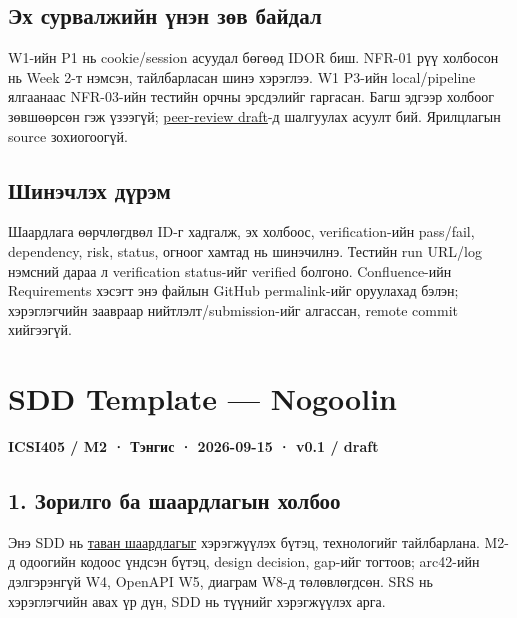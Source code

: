 \documentclass[
  11pt,
  a4paper,
]{article}
\begin{document}
\begin{landscape}
\subsection{Эх сурвалжийн үнэн зөв
байдал}\label{doc5-ux44dux445-ux441ux443ux440ux432ux430ux43bux436ux438ux439ux43d-ux4afux43dux44dux43d-ux437ux4e9ux432-ux431ux430ux439ux434ux430ux43b}

W1-ийн P1 нь cookie/session асуудал бөгөөд IDOR биш. NFR-01 рүү холбосон
нь Week 2-т нэмсэн, тайлбарласан шинэ хэрэглээ. W1 P3-ийн local/pipeline
ялгаанаас NFR-03-ийн тестийн орчны эрсдэлийг гаргасан. Багш эдгээр
холбоог зөвшөөрсөн гэж үзээгүй;
\href{wiki/peer-review-draft.md}{peer-review draft}-д шалгуулах асуулт
бий. Ярилцлагын source зохиогоогүй.

\subsection{Шинэчлэх
дүрэм}\label{doc5-ux448ux438ux43dux44dux447ux43bux44dux445-ux434ux4afux440ux44dux43c}

Шаардлага өөрчлөгдвөл ID-г хадгалж, эх холбоос, verification-ийн
pass/fail, dependency, risk, status, огноог хамтад нь шинэчилнэ. Тестийн
run URL/log нэмсний дараа л verification status-ийг verified болгоно.
Confluence-ийн Requirements хэсэгт энэ файлын GitHub permalink-ийг
оруулахад бэлэн; хэрэглэгчийн заавраар нийтлэлт/submission-ийг алгассан,
remote commit хийгээгүй.

\end{landscape}
\clearpage
\section{SDD Template --- Nogoolin}\label{doc6-sdd-template-nogoolin}

\textbf{ICSI405 / M2 · Тэнгис · 2026-09-15 · v0.1 / draft}

\subsection{1. Зорилго ба шаардлагын
холбоо}\label{doc6-ux437ux43eux440ux438ux43bux433ux43e-ux431ux430-ux448ux430ux430ux440ux434ux43bux430ux433ux44bux43d-ux445ux43eux43bux431ux43eux43e}

Энэ SDD нь \href{../../requirements/requirements.md}{таван шаардлагыг}
хэрэгжүүлэх бүтэц, технологийг тайлбарлана. M2-д одоогийн кодоос үндсэн
бүтэц, design decision, gap-ийг тогтоов; arc42-ийн дэлгэрэнгүй W4,
OpenAPI W5, диаграм W8-д төлөвлөгдсөн. SRS нь хэрэглэгчийн авах үр дүн,
SDD нь түүнийг хэрэгжүүлэх арга.
\end{document}
